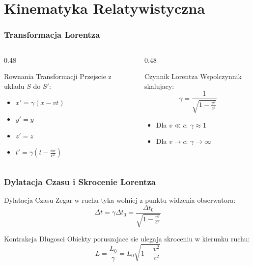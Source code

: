 \documentclass[10pt,aspectratio=169]{beamer}
\begin{document}
\section{Kinematyka Relatywistyczna}
\begin{frame}{\frametitle{Transformacja Lorentza}}
    \begin{columns}[T]
        \begin{column}{0.48\textwidth}
            \begin{block}{Rownania Transformacji}
                Przejscie z ukladu $S$ do $S'$:
                \begin{itemize}
                    \item $x' = \gamma (x - vt)$
                    \item $y' = y$
                    \item $z' = z$
                    \item $t' = \gamma \left(t - \frac{vx}{c^2}\right)$
                \end{itemize}
            \end{block}
        \end{column}
        
        \begin{column}{0.48\textwidth}
            \begin{exampleblock}{Czynnik Lorentza}
                Wspolczynnik skalujacy:
                \[
                    \gamma = \frac{1}{\sqrt{1 - \frac{v^2}{c^2}}}
                \]
                \begin{itemize}
                    \item Dla $v \ll c$: $\gamma \approx 1$
                    \item Dla $v \to c$: $\gamma \to \infty$
                \end{itemize}
            \end{exampleblock}
        \end{column}
    \end{columns}
\end{frame}

\begin{frame}{\frametitle{Dylatacja Czasu i Skrocenie Lorentza}}
    \begin{block}{Dylatacja Czasu}
        Zegar w ruchu tyka wolniej z punktu widzenia obserwatora:
        \[
            \Delta t = \gamma \Delta t_0 = \frac{\Delta t_0}{\sqrt{1 - \frac{v^2}{c^2}}}
        \]
    \end{block}

    \begin{block}{Kontrakcja Dlugosci}
        Obiekty poruszajace sie ulegaja skroceniu w kierunku ruchu:
        \[
            L = \frac{L_0}{\gamma} = L_0 \sqrt{1 - \frac{v^2}{c^2}}
        \]
    \end{block}
\end{frame}
\end{document}
